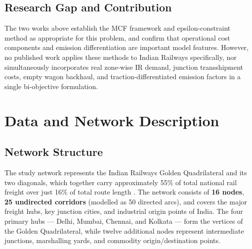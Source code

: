 \documentclass[11pt, a4paper]{article}
\numberwithin{equation}{section}
\numberwithin{figure}{section}
\numberwithin{table}{section}
\begin{document}
\subsection{Research Gap and Contribution}

The two works above establish the MCF framework and epsilon-constraint method as
appropriate for this problem, and confirm that operational cost components and
emission differentiation are important model features. However, no published work
applies these methods to Indian Railways specifically, nor simultaneously incorporates
real zone-wise IR demand, junction transshipment costs, empty wagon backhaul, and
traction-differentiated emission factors in a single bi-objective formulation.


\section{Data and Network Description}
\label{sec:data}

\subsection{Network Structure}

The study network represents the Indian Railways Golden Quadrilateral and its two
diagonals, which together carry approximately 55\% of total national rail freight over
just 16\% of total route length \cite{dfccil2023}. The network consists of \textbf{16
nodes}, \textbf{25 undirected corridors} (modelled as 50 directed arcs), and covers the
major freight hubs, key junction cities, and industrial origin points of India. The four
primary hubs — Delhi, Mumbai, Chennai, and Kolkata — form the vertices of the Golden
Quadrilateral, while twelve additional nodes represent intermediate junctions,
marshalling yards, and commodity origin/destination points.
\end{document}
